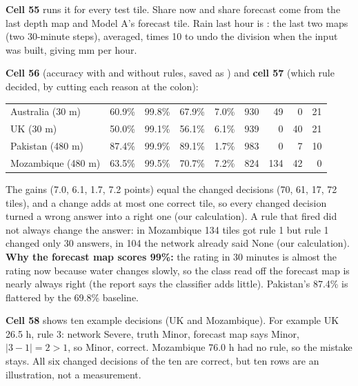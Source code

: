 \textbf{Cell 55} runs it for every test tile. Share now and share forecast come from the last depth map and Model A's forecast tile. Rain last hour is : the last two maps (two 30-minute steps), averaged, times 10 to undo the division when the input was built, giving mm per hour.

\textbf{Cell 56} (accuracy with and without rules, saved as ) and \textbf{cell 57} (which rule decided, by cutting each reason at the colon):
\begin{center}
\small
\begin{tabularx}{\linewidth}{|l|Y|Y|Y|Y|r|r|r|r|}
\hline
{}  &  &  &  &  &  &  &  & \\ \hline
Australia (30 m) & 60.9\% & 99.8\% & 67.9\% & 7.0\% & 930 & 49 & 0 & 21\\ \hline
UK (30 m) & 50.0\% & 99.1\% & 56.1\% & 6.1\% & 939 & 0 & 40 & 21\\ \hline
Pakistan (480 m) & 87.4\% & 99.9\% & 89.1\% & 1.7\% & 983 & 0 & 7 & 10\\ \hline
Mozambique (480 m) & 63.5\% & 99.5\% & 70.7\% & 7.2\% & 824 & 134 & 42 & 0\\ \hline
\end{tabularx}
\end{center}
The gains (7.0, 6.1, 1.7, 7.2 points) equal the changed decisions (70, 61, 17, 72 tiles), and a change adds at most one correct tile, so every changed decision turned a wrong answer into a right one (our calculation). A rule that fired did not always change the answer: in Mozambique 134 tiles got rule 1 but rule 1 changed only 30 answers, in 104 the network already said None (our calculation). \textbf{Why the forecast map scores 99\%:} the rating in 30 minutes is almost the rating now because water changes slowly, so the class read off the forecast map is nearly always right (the report says the classifier adds little). Pakistan's 87.4\% is flattered by the 69.8\% baseline.

\textbf{Cell 58} shows ten example decisions (UK and Mozambique). For example UK 26.5 h, rule 3: network Severe, truth Minor, forecast map says Minor, $|3-1|=2>1$, so Minor, correct. Mozambique 76.0 h had no rule, so the mistake stays. All six changed decisions of the ten are correct, but ten rows are an illustration, not a measurement.

